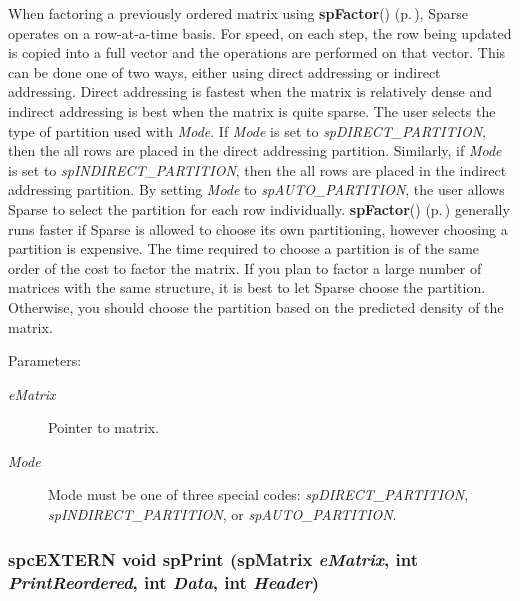 When factoring a previously ordered matrix using {\bf sp\-Factor}() {\rm (p.\,\pageref{spMatrix_8h_a30})}, Sparse operates on a row-at-a-time basis. For speed, on each step, the row being updated is copied into a full vector and the operations are performed on that vector. This can be done one of two ways, either using direct addressing or indirect addressing. Direct addressing is fastest when the matrix is relatively dense and indirect addressing is best when the matrix is quite sparse. The user selects the type of partition used with {\em Mode}. If {\em Mode} is set to {\em sp\-DIRECT\_\-PARTITION}, then the all rows are placed in the direct addressing partition. Similarly, if {\em Mode} is set to {\em sp\-INDIRECT\_\-PARTITION}, then the all rows are placed in the indirect addressing partition. By setting {\em Mode} to {\em sp\-AUTO\_\-PARTITION}, the user allows Sparse to select the partition for each row individually. {\bf sp\-Factor}() {\rm (p.\,\pageref{spMatrix_8h_a30})} generally runs faster if Sparse is allowed to choose its own partitioning, however choosing a partition is expensive. The time required to choose a partition is of the same order of the cost to factor the matrix. If you plan to factor a large number of matrices with the same structure, it is best to let Sparse choose the partition. Otherwise, you should choose the partition based on the predicted density of the matrix.\begin{Desc}
\item[Parameters: ]\par
\begin{description}
\item[{\em 
e\-Matrix}]Pointer to matrix. \item[{\em 
Mode}]Mode must be one of three special codes: {\em sp\-DIRECT\_\-PARTITION}, {\em sp\-INDIRECT\_\-PARTITION}, or {\em sp\-AUTO\_\-PARTITION}. \end{description}
\end{Desc}
\subsubsection{\setlength{\rightskip}{0pt plus 5cm}spc\-EXTERN void sp\-Print ({\bf sp\-Matrix} {\em e\-Matrix}, int {\em Print\-Reordered}, int {\em Data}, int {\em Header})}\label{spMatrix_8h_a48}


